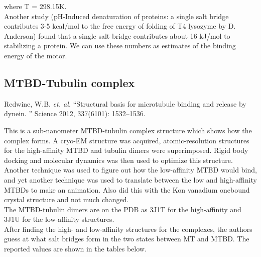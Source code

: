 \documentclass[10pt]{article} %
\begin{document}
where T = 298.15K.\\

Another study (pH-Induced denaturation of proteins: a single salt bridge contributes 3-5 kcal/mol to the free energy of folding of T4 lysozyme by D. Anderson) found that
a single salt bridge contributes about 16 kJ/mol to stabilizing a protein. We can use these numbers as estimates of the binding energy of the motor.\\

\subsection{MTBD-Tubulin complex}
Redwine, W.B. \textit{et. al.} ``Structural basis for microtubule binding and release by dynein. '' Science 2012, 337(6101): 1532–1536.

This is a sub-nanometer MTBD-tubulin complex structure which shows how the complex forms. A cryo-EM structure was acquired, atomic-resolution structures for the high-affinity
MTBD and tubulin dimers were superimposed.  Rigid body docking and molecular dynamics was then used to optimize this structure. Another technique was used to figure out how
the low-affinity MTBD would bind, and yet another technique was used to translate between the low and high-affinity MTBDs to make an animation. Also did this with the Kon
vanadium onebound crystal structure and not much changed.\\

The MTBD-tubulin dimers are on the PDB as 3J1T for the high-affinity and 3J1U for the low-affinity structures.\\

After finding the high- and low-affinity structures for the complexes, the authors guess at what salt bridges form in the two states between MT and MTBD. The reported values are shown in the tables below.\\
\end{document}
